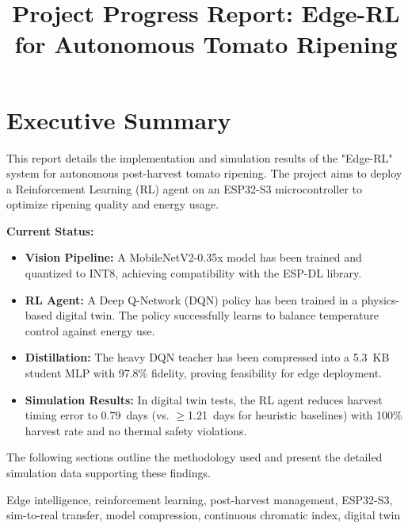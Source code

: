 \documentclass[conference]{IEEEtran}
\begin{document}
    \title{Project Progress Report: Edge-RL for Autonomous Tomato Ripening}

    \author{
    }

    \maketitle

    \section*{Executive Summary}
    
    This report details the implementation and simulation results of the "Edge-RL" system for autonomous post-harvest tomato ripening. The project aims to deploy a Reinforcement Learning (RL) agent on an ESP32-S3 microcontroller to optimize ripening quality and energy usage.
    
    \textbf{Current Status:}
    \begin{itemize}
        \item \textbf{Vision Pipeline:} A MobileNetV2-0.35x model has been trained and quantized to INT8, achieving compatibility with the ESP-DL library.
        \item \textbf{RL Agent:} A Deep Q-Network (DQN) policy has been trained in a physics-based digital twin. The policy successfully learns to balance temperature control against energy use.
        \item \textbf{Distillation:} The heavy DQN teacher has been compressed into a 5.3~KB student MLP with 97.8\% fidelity, proving feasibility for edge deployment.
        \item \textbf{Simulation Results:} In digital twin tests, the RL agent reduces harvest timing error to 0.79~days (vs. $\geq$1.21~days for heuristic baselines) with 100\% harvest rate and no thermal safety violations.
    \end{itemize}
    
    The following sections outline the methodology used and present the detailed simulation data supporting these findings.

    \begin{IEEEkeywords}
    Edge intelligence, reinforcement learning, post-harvest management, ESP32-S3, sim-to-real transfer, model compression, continuous chromatic index, digital twin
    \end{IEEEkeywords}
\end{document}
